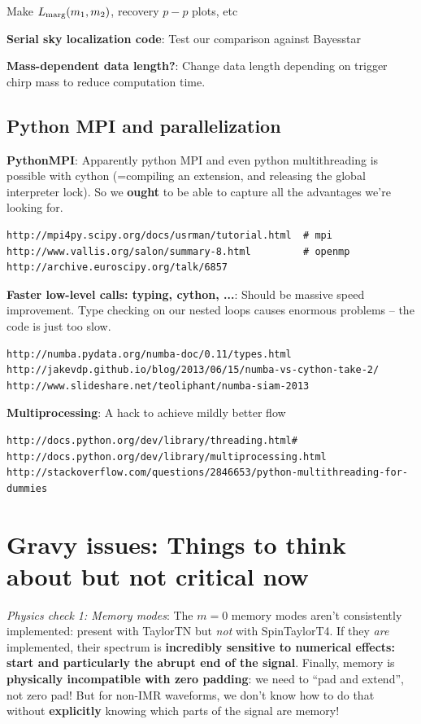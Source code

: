 \documentclass[twocolumn,prd,nofootinbib]{revtex4}
\begin{document}
Make $L_{\rm marg}(m_1,m_2)$, recovery $p-p$ plots, etc

\noindent \textbf{Serial sky localization code}: Test our comparison against Bayesstar

\noindent \textbf{Mass-dependent data length?}: Change data length depending on trigger chirp mass to reduce computation time.


\subsection{Python MPI and parallelization}

\noindent \textbf{PythonMPI}: Apparently python MPI and even python multithreading is possible with cython (=compiling an extension, and releasing the
global interpreter lock).  So we \textbf{ought} to be able to capture all the advantages we're looking for.
\begin{verbatim}
http://mpi4py.scipy.org/docs/usrman/tutorial.html  # mpi
http://www.vallis.org/salon/summary-8.html         # openmp
http://archive.euroscipy.org/talk/6857
\end{verbatim}

\noindent \textbf{Faster low-level calls: typing, cython, ...}: Should be massive speed improvement.  Type checking on
our nested loops causes enormous problems -- the code is just too slow.
\begin{verbatim}
http://numba.pydata.org/numba-doc/0.11/types.html
http://jakevdp.github.io/blog/2013/06/15/numba-vs-cython-take-2/
http://www.slideshare.net/teoliphant/numba-siam-2013
\end{verbatim}

\noindent \textbf{Multiprocessing}:  A hack to achieve mildly better flow
\begin{verbatim}
http://docs.python.org/dev/library/threading.html#	
http://docs.python.org/dev/library/multiprocessing.html
http://stackoverflow.com/questions/2846653/python-multithreading-for-dummies
\end{verbatim}
\appendix
\section{Gravy issues: Things to think about but not critical now}

\emph{Physics check 1: Memory modes}: The $m=0$ memory modes \cite{2009PhRvD..80b4002F,2009ApJ...696L.159F,2010CQGra..27h4036F,2011PhRvD..84l4013F} aren't consistently implemented: present with
  TaylorTN but \emph{not} with SpinTaylorT4.   If they \emph{are}
  implemented, their spectrum is \textbf{incredibly sensitive to numerical effects: start and particularly the abrupt
    end of the signal}.  Finally, memory is \textbf{physically incompatible with zero padding}: we need to ``pad and
  extend'', not zero pad!    But for non-IMR waveforms, we don't know how to do that without \textbf{explicitly} knowing
  which parts of the signal are memory!
\end{document}
